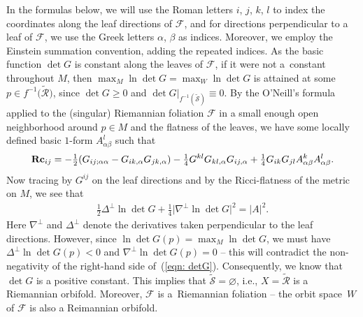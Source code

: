 \documentclass[10pt,a4paper]{amsart}
\numberwithin{equation}{section}
\newcommand{\Rc}{\operatorname{\bf Rc}}
\begin{document}
In the formulas below, we will use the Roman letters $i$, $j$, $k$, $l$ to index the
coordinates along the leaf directions of $\mathcal{F}$, and for directions
perpendicular to a leaf of $\mathcal{F}$, we use the Greek letters
$\alpha$, $\beta$ as indices. Moreover, we employ the Einstein
summation convention, adding the repeated indices. As the basic function
$\det G$ is constant along the leaves of $\mathcal{F}$, if it were not a~constant throughout $M$, then $\max_M \ln \det G=\max_W \ln \det G$ is attained
at some $p\in f^{-1}\big(\tilde{\mathcal{R}}\big)$, since $\det G\ge 0$ and $\det
G|_{f^{-1}(\tilde{\mathcal{S}})}\equiv 0$. By the O'Neill's formula~\cite{ONeill} applied to the (singular) Riemannian foliation $\mathcal{F}$ in a
small enough open neighborhood around $p\in M$ and the flatness of the leaves,
we have some locally defined basic $1$-form $A_{\alpha\beta}^l$ such that
\begin{align}\label{eqn: ONeill_G}
\Rc_{ij} = -\tfrac{1}{2} ( G_{ij;\alpha\alpha}
-G_{ik,\alpha}G_{jk,\alpha} ) -\tfrac{1}{4}G^{kl}G_{kl,\alpha}
G_{ij,\alpha}+\tfrac{1}{4}G_{ik}G_{jl}A^k_{\alpha\beta}A^l_{\alpha\beta}.
\end{align}
Now tracing by $G^{ij}$ on the leaf directions and by the Ricci-flatness of the
metric on $M$, we see that
\begin{align}\label{eqn: detG}
\tfrac{1}{2}\Delta^{\perp}\ln \det G+\tfrac{1}{4}\big|\nabla^{\perp} \ln \det G\big|^2 = |A|^2.
\end{align}
Here $\nabla^{\perp}$ and $\Delta^{\perp}$ denote the derivatives taken
perpendicular to the leaf directions. However, since $\ln \det G(p)=\max_M \ln
\det G$, we must have $\Delta^{\perp}\ln\det G(p)<0$ and $\nabla^{\perp}\ln
\det G(p)=0$ -- this will contradict the non-negativity of the right-hand side
of~(\ref{eqn: detG}). Consequently, we know that $\det G$ is a positive
constant. This implies that $\tilde{\mathcal{S}}=\varnothing$, i.e.,
$X=\tilde{\mathcal{R}}$ is a Riemannian orbifold. Moreover, $\mathcal{F}$ is a~Riemannian foliation -- the orbit space~$W$ of $\mathcal{F}$ is
also a Reimannian orbifold.
\end{document}

